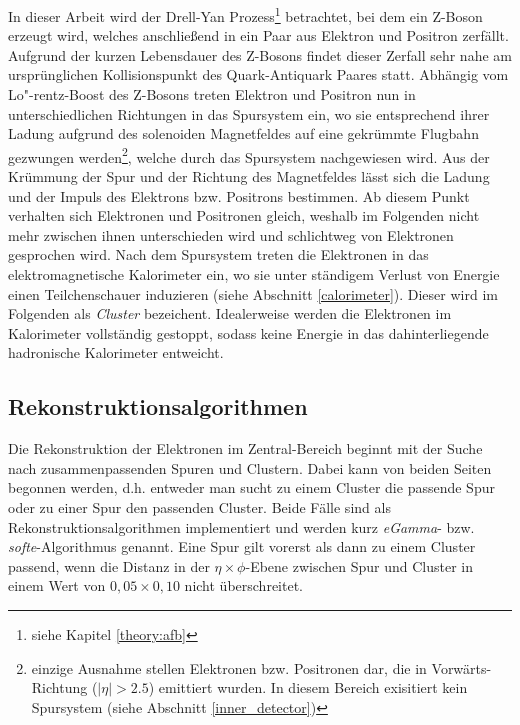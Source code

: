 In dieser Arbeit wird der Drell-Yan Prozess\footnote{siehe Kapitel
\ref{theory:afb}} betrachtet, bei dem ein Z-Boson erzeugt wird, welches
anschließend in ein Paar aus Elektron und Positron zerfällt. Aufgrund der
kurzen Lebensdauer des Z-Bosons findet dieser Zerfall sehr nahe am
ursprünglichen Kollisionspunkt des Quark-Antiquark Paares statt. Abhängig vom
Lo"-rentz-Boost des Z-Bosons treten Elektron und Positron nun in
unterschiedlichen Richtungen in das Spursystem ein, wo sie entsprechend ihrer
Ladung aufgrund des solenoiden Magnetfeldes auf eine gekrümmte Flugbahn
gezwungen werden\footnote{einzige Ausnahme stellen Elektronen bzw. Positronen
dar, die in Vorwärts-Richtung ($|\eta|>2.5$) emittiert wurden. In diesem
Bereich exisitiert kein Spursystem (siehe Abschnitt \ref{inner_detector})},
welche durch das Spursystem nachgewiesen wird. Aus der Krümmung der Spur und
der Richtung des Magnetfeldes lässt sich die Ladung und der Impuls des
Elektrons bzw. Positrons bestimmen. Ab diesem Punkt verhalten sich Elektronen
und Positronen gleich, weshalb im Folgenden nicht mehr zwischen ihnen
unterschieden wird und schlichtweg von Elektronen gesprochen wird. Nach dem
Spursystem treten die Elektronen in das elektromagnetische Kalorimeter ein, wo
sie unter ständigem Verlust von Energie einen Teilchenschauer induzieren (siehe
Abschnitt \ref{calorimeter}). Dieser wird im Folgenden als \textit{Cluster}
bezeichent. Idealerweise werden die Elektronen im Kalorimeter vollständig
gestoppt, sodass keine Energie in das dahinterliegende hadronische Kalorimeter
entweicht.



\subsection{Rekonstruktionsalgorithmen}
\label{reconstruction}
Die Rekonstruktion der Elektronen im Zentral-Bereich beginnt mit der Suche nach
zusammenpassenden Spuren und Clustern. Dabei kann von beiden Seiten begonnen
werden, d.h. entweder man sucht zu einem Cluster die passende Spur oder zu
einer Spur den passenden Cluster. Beide Fälle sind als
Rekonstruktionsalgorithmen implementiert und werden kurz \textit{eGamma}- bzw.
\textit{softe}-Algorithmus genannt. Eine Spur gilt vorerst als dann zu einem
Cluster passend, wenn die Distanz in der $\eta\times\phi$-Ebene zwischen Spur
und Cluster in einem Wert von $0,05\times0,10$ nicht überschreitet.

